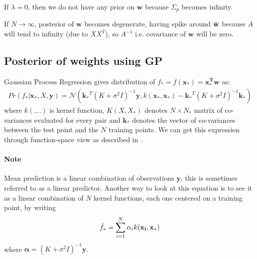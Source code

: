 \documentclass[12pt]{article}
\begin{document}
If $\lambda = 0$, then we do not have any prior on $\mathbf{w}$ because $\Sigma_p$ becomes infinity.

If $N \xrightarrow{} \infty$, posterior of $\mathbf{w}$ becomes degenerate, having spike around $\mathbf{\Bar{w}}$ because $A$ will tend to infinity (due to $XX^T$), so $A^{-1}$ i.e. covariance of $\mathbf{w}$ will be zero.

\subsection{Posterior of weights using GP}
Gaussian Process Regression gives distribution of $f_* = f(\mathbf{x_*}) = \mathbf{x_*^T w}$ as: 
\begin{align}
    Pr(f_*| \mathbf{x_*}, X, \mathbf{y}) = \mathcal{N} ( \mathbf{k_*}^T(K+\sigma^2 I)^{-1}\mathbf{y}, k(\mathbf{x_*, x_*})- \mathbf{k_*}^T(K+\sigma^2 I)^{-1}\mathbf{k_*} )
\end{align}
where $k(.,.)$ is kernel function, $K(X,X_*)$ denotes $N \times N_*$ matrix of co-variances evaluated for every pair and $\mathbf{k_*}$ denotes the vector of co-variances between the
test point and the $N$ training points. We can get this expression through function-space view as described in \cite{rasmussen}.
\paragraph{Note} Mean prediction is a linear combination of observations $\mathbf{y}$, this is sometimes referred to as a linear predictor. Another way to look at this equation is to see it as a linear combination of $N$ kernel functions, each one centered on a training point, by writing
\begin{align}
    \Bar{f_*} = \sum_{i=1}^N \alpha_i k(\mathbf{x_i, x_*})
\end{align}
where $\mathbf{\alpha} = (K+\sigma^2I)^{-1} \mathbf{y}$.
\end{document}
